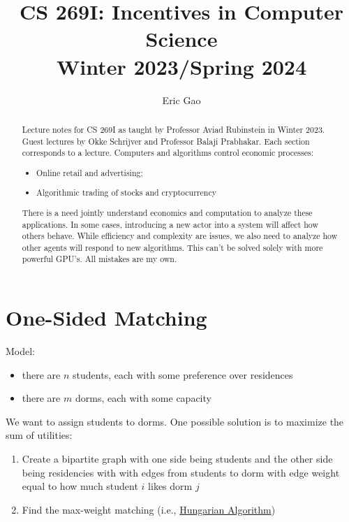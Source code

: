 \documentclass[dvipsnames]{article}
\title{CS 269I: Incentives in Computer Science \\
Winter 2023/Spring 2024}
\author{Eric Gao}
\date{}
\theoremstyle{definition}
\theoremstyle{remark}
\newenvironment{mech}[1]{\begin{tcolorbox}[colback=red!5!white,colframe=red!75!black,title={#1}]}{\end{tcolorbox}}
\begin{document}
\maketitle

\begin{abstract}
	Lecture notes for CS 269I as taught by Professor Aviad Rubinstein in Winter 2023. Guest lectures by Okke Schrijver and Professor Balaji Prabhakar. Each section corresponds to a lecture. Computers and algorithms control economic processes:
	\begin{itemize}
		\item Online retail and advertising;
		\item Algorithmic trading of stocks and cryptocurrency
	\end{itemize}
	There is a need jointly understand economics and computation to analyze these applications. In some cases, introducing a new actor into a system will affect how others behave. While efficiency and complexity are issues, we also need to analyze how other agents will respond to new algorithms. This can't be solved solely with more powerful GPU's. All mistakes are my own. 
\end{abstract}

\tableofcontents

\newpage

\section{One-Sided Matching}

Model:
\begin{itemize}
	\item there are $n$ students, each with some preference over residences 
	\item there are $m$ dorms, each with some capacity
\end{itemize}
We want to assign students to dorms. One possible solution is to maximize the sum of utilities:
\begin{mech}{Utility Maximization}
\begin{enumerate}
	\item Create a bipartite graph with one side being students and the other side being residencies with with edges from students to dorm with edge weight equal to how much student $i$ likes dorm $j$
	\item Find the max-weight matching (i.e., \href{https://en.wikipedia.org/wiki/Hungarian_algorithm}{Hungarian Algorithm})
\end{enumerate}
\end{mech}
\end{document}
